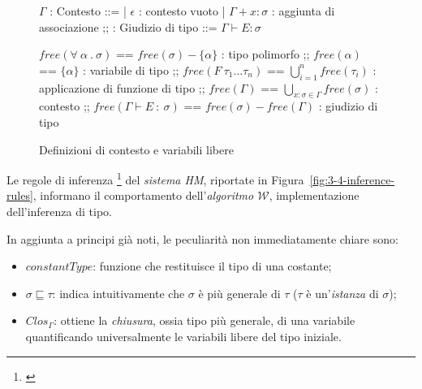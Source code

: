 \begin{figure}
    \vspace{4mm}
    \begin{bnf}
        $\Gamma$ : \small{Contesto} ::=
        | $\epsilon$ : \small{contesto vuoto}
        | $\Gamma + x \colon \sigma$ : \small{aggiunta di associazione}
        ;;
        : \small{Giudizio di tipo} ::= $\Gamma \vdash E \colon \sigma$
    \end{bnf}
    \par\vspace{12mm}
    \begin{bnf}
        $free(\forall\ \alpha\ .\ \sigma)$ == $free(\sigma) - \{\alpha\}$ : \small{tipo polimorfo}
        ;;
        $free(\alpha)$ == $\{\alpha\}$ : \small{variabile di tipo}
        ;;
        $free(F\ \tau_1\ldots\tau_n)$ == $\bigcup\limits_{i=1}^{n} free(\tau_i)$ : \small{applicazione di funzione di tipo}
        ;;
        $free(\Gamma)$ == $\bigcup\limits_{x\colon\sigma\in\Gamma} free(\sigma)$ : \small{contesto}
        ;;
        $free(\Gamma\vdash E\ \colon\ \sigma)$ == $free(\sigma) - free(\Gamma)$ : \small{giudizio di tipo}
    \end{bnf}
    \caption{Definizioni di contesto e variabili libere}
    \label{fig:3-4-context-free-variables}
    \vspace{4mm}
\end{figure}

\noindent Le regole di inferenza%
\footnote{ \cite{Clement-1986-MiniML}}
del \textit{sistema HM}, riportate in Figura~\ref{fig:3-4-inference-rules},
informano il comportamento dell'\textit{algoritmo $\mathcal{W}$}, implementazione dell'inferenza di tipo.

\newpage

\noindent In aggiunta a principi già noti, le peculiarità non immediatamente chiare sono:
\begin{itemize}
    \item $constantType$: funzione che restituisce il tipo di una costante;
    \item $\sigma \sqsubseteq \tau$: indica intuitivamente che $\sigma$ è più generale di $\tau$
          ($\tau$ è un'\textit{istanza} di $\sigma$);
    \item $Clos_\Gamma$: ottiene la \textit{chiusura}, ossia tipo più generale, di una variabile
          quantificando universalmente le variabili libere del tipo iniziale.
\end{itemize}

